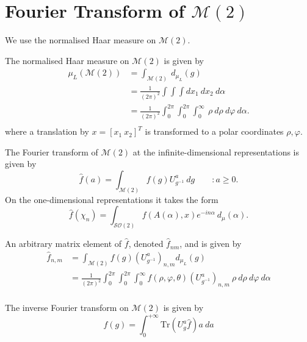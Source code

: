 \documentclass{article}
\begin{document}
\section{Fourier Transform of $\mathcal{M}(2)$} 

We use the normalised Haar measure on $\mathcal{M}(2)$. 
\begin{define}
    The normalised Haar measure on $\mathcal{M}(2)$ is given by
    \[%
        \begin{split}
        \mu_{L}(\mathcal{M}(2)) 
        &= \int_{\mathcal{M}(2)} \ d_{\mu_{L}} (g) \\
        &= \frac{1}{(2\pi)^{2}} \int\int\int dx_1 \ dx_2 \ d\alpha \\
        &= \frac{1}{(2\pi)^{2}} \int^{2\pi}_{0}\int^{2\pi}_{0}\int^{\infty}_{0} \ \rho \ d\rho \ d\varphi \ d\alpha .\\
        \end{split}
    \]%
    where a translation by $x = [x_1 \ x_2]^{T}$ is transformed to a polar coordinates $\rho ,\varphi$.
\end{define}
\begin{define}
    The Fourier transform of $\mathcal{M}(2)$ at the infinite-dimensional representations is given by
    \[%
        \hat{f}(a) = \int_{\mathcal{M}(2)} f(g) U^{a}_{g^{-1}} \ dg \qquad : a \geq 0.
    \]%
    On the one-dimensional representations it takes the form
    \[%
        \hat{f}(\chi_{n}) = \int_{\mathcal{SO}(2)} f(A(\alpha),x) e^{-in\alpha} \ d_{\mu}(\alpha) .
    \]%
\end{define}

\begin{define}
    An arbitrary matrix element of $\hat{f}$, denoted $\hat{f}_{nm}$, and is given by
    \[%
        \begin{split}
            \hat{f}_{n,m} &= \int_{\mathcal{M}(2)} f(g) (U^{a}_{g^{-1}})_{n,m} d_{\mu_{L}}(g)  \\
                         &= \frac{1}{(2\pi)^{2}} \int^{2\pi}_{0}\int^{2\pi}_{0}\int^{\infty}_{0} f(\rho, \varphi, \theta) (U^{a}_{g^{-1}})_{n,m} \ \rho \ d\rho \ d\varphi \ d\alpha \\
        \end{split}
    \]%
\end{define}

\begin{define}
    The inverse Fourier transform on $\mathcal{M}(2)$  is given by
    \[%
        f(g) = \int^{+\infty}_{0} \text{Tr}\left(U^{a}_{g}\hat{f}\right) a \ da
    \]
\end{define}
\end{document}
